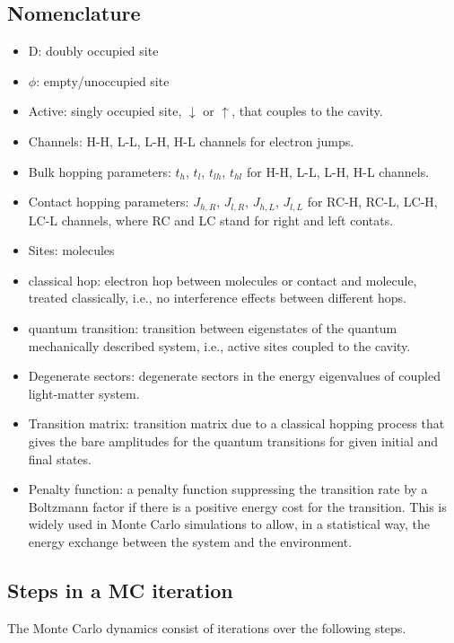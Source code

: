 \documentclass[a4paper,twocolumn]{revtex4-1} %
\newcommand{\da}{\downarrow}
\newcommand{\ua}{\uparrow}
\begin{document}
\subsection{Nomenclature}
\begin{itemize}
\item D: doubly occupied site
\item $\phi$: empty/unoccupied site
\item Active: singly occupied site, $\da$ or $\ua$, that couples to the cavity.
\item Channels: H-H, L-L, L-H, H-L channels for electron jumps.
\item Bulk hopping parameters: $t_h$, $t_l$, $t_{lh}$, $t_{hl}$ for H-H, L-L, L-H, H-L channels.
\item Contact hopping parameters: $J_{h,R}$, $J_{l,R}$, $J_{h,L}$, $J_{l,L}$ for RC-H, RC-L, LC-H, LC-L channels, where RC and LC stand for right and left contats.
\item Sites: molecules
\item classical hop: electron hop between molecules or contact and molecule, treated classically, i.e., no interference effects between different hops.
\item quantum transition: transition between eigenstates of the quantum mechanically described system, i.e., active sites coupled to the cavity.
\item Degenerate sectors: degenerate sectors in the energy eigenvalues of coupled light-matter system. 
\item Transition matrix: transition matrix due to a classical hopping process 
that gives the bare amplitudes for the quantum transitions for given initial and final states.
\item Penalty function: a penalty function suppressing the transition rate by a Boltzmann factor if there is a positive energy cost for the transition. This is widely used in Monte Carlo simulations to allow, in a statistical way, the energy exchange between the system and the environment. 
\end{itemize}


\subsection{Steps in a MC iteration}
The Monte Carlo dynamics consist of iterations over the following steps.
\end{document}
